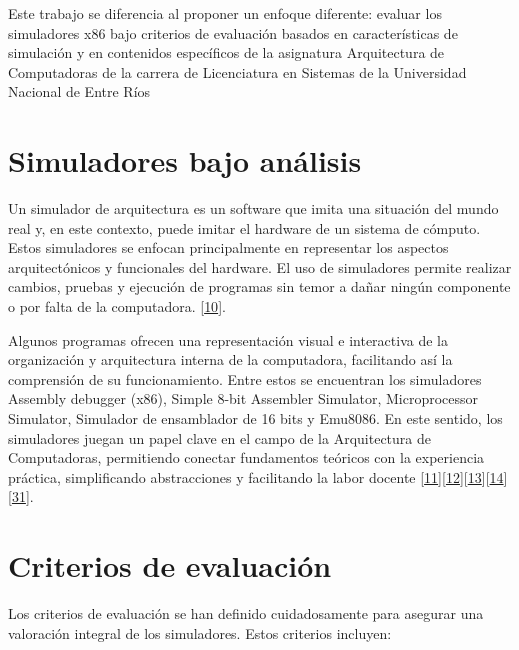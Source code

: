 \documentclass[12pt,twoside]{templates/unerthesis}
\begin{document}
Este trabajo se diferencia al proponer un enfoque diferente: evaluar los simuladores x86 bajo criterios de evaluación basados en características de simulación y en contenidos específicos de la asignatura Arquitectura de Computadoras de la carrera de Licenciatura en Sistemas de la Universidad Nacional de Entre Ríos

\hypertarget{simuladores-bajo-anuxe1lisis}{%
\section{Simuladores bajo análisis}\label{simuladores-bajo-anuxe1lisis}}

Un simulador de arquitectura es un software que imita una situación del mundo real y, en este contexto, puede imitar el hardware de un sistema de cómputo. Estos simuladores se enfocan principalmente en representar los aspectos arquitectónicos y funcionales del hardware. El uso de simuladores permite realizar cambios, pruebas y ejecución de programas sin temor a dañar ningún componente o por falta de la computadora. {[}\protect\hyperlink{ref-radivojevic_design_2011}{10}{]}.

Algunos programas ofrecen una representación visual e interactiva de la organización y arquitectura interna de la computadora, facilitando así la comprensión de su funcionamiento. Entre estos se encuentran los simuladores Assembly debugger (x86), Simple 8-bit Assembler Simulator, Microprocessor Simulator, Simulador de ensamblador de 16 bits y Emu8086. En este sentido, los simuladores juegan un papel clave en el campo de la Arquitectura de Computadoras, permitiendo conectar fundamentos teóricos con la experiencia práctica, simplificando abstracciones y facilitando la labor docente {[}\protect\hyperlink{ref-nikolic_survey_2009}{11}{]}{[}\protect\hyperlink{ref-hasan_survey_2012}{12}{]}{[}\protect\hyperlink{ref-hennessy_computer_2012}{13}{]}{[}\protect\hyperlink{ref-stallings_computer_2013}{14}{]}{[}\protect\hyperlink{ref-behrooz_computer_2005}{31}{]}.

\hypertarget{criterios-de-evaluaciuxf3n}{%
\section{Criterios de evaluación}\label{criterios-de-evaluaciuxf3n}}

Los criterios de evaluación se han definido cuidadosamente para asegurar una valoración integral de los simuladores. Estos criterios incluyen:
\end{document}
